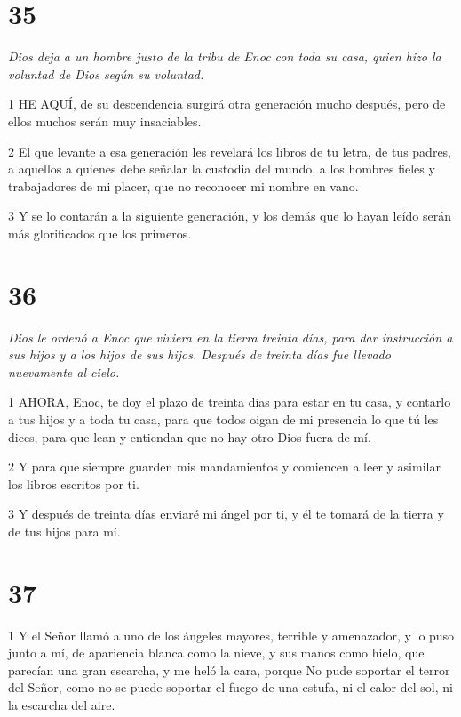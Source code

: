 \chapter{35}

\par \textit{Dios deja a un hombre justo de la tribu de Enoc con toda su casa, quien hizo la voluntad de Dios según su voluntad.}

\par 1 HE AQUÍ, de su descendencia surgirá otra generación mucho después, pero de ellos muchos serán muy insaciables.

\par 2 El que levante a esa generación les revelará los libros de tu letra, de tus padres, a aquellos a quienes debe señalar la custodia del mundo, a los hombres fieles y trabajadores de mi placer, que no reconocer mi nombre en vano.

\par 3 Y se lo contarán a la siguiente generación, y los demás que lo hayan leído serán más glorificados que los primeros.

\chapter{36}

\par \textit{Dios le ordenó a Enoc que viviera en la tierra treinta días, para dar instrucción a sus hijos y a los hijos de sus hijos. Después de treinta días fue llevado nuevamente al cielo.}

\par 1 AHORA, Enoc, te doy el plazo de treinta días para estar en tu casa, y contarlo a tus hijos y a toda tu casa, para que todos oigan de mi presencia lo que tú les dices, para que lean y entiendan que no hay otro Dios fuera de mí.

\par 2 Y para que siempre guarden mis mandamientos y comiencen a leer y asimilar los libros escritos por ti.

\par 3 Y después de treinta días enviaré mi ángel por ti, y él te tomará de la tierra y de tus hijos para mí.

\chapter{37}

\par 1 Y el Señor llamó a uno de los ángeles mayores, terrible y amenazador, y lo puso junto a mí, de apariencia blanca como la nieve, y sus manos como hielo, que parecían una gran escarcha, y me heló la cara, porque No pude soportar el terror del Señor, como no se puede soportar el fuego de una estufa, ni el calor del sol, ni la escarcha del aire.

